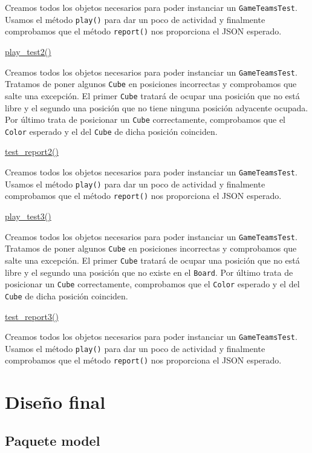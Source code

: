 \documentclass[12pt,a4paper,openright]{book}
\theoremstyle{break}
\begin{document}
Creamos todos los objetos necesarios para poder instanciar un \texttt{GameTeamsTest}. Usamos el método \texttt{play()} para dar un poco de actividad y finalmente comprobamos que el método \texttt{report()} nos proporciona el JSON esperado.

\underline{play\_test2()}

Creamos todos los objetos necesarios para poder instanciar un \texttt{GameTeamsTest}. Tratamos de poner algunos \texttt{Cube} en posiciones incorrectas y comprobamos que salte una excepción. El primer \texttt{Cube} tratará de ocupar una posición que no está libre y el segundo una posición que no tiene ninguna posición adyacente ocupada. Por último trata de posicionar un \texttt{Cube} correctamente, comprobamos que el \texttt{Color} esperado y el del \texttt{Cube} de dicha posición coinciden.

\underline{test\_report2()}

Creamos todos los objetos necesarios para poder instanciar un \texttt{GameTeamsTest}. Usamos el método \texttt{play()} para dar un poco de actividad y finalmente comprobamos que el método \texttt{report()} nos proporciona el JSON esperado.

\underline{play\_test3()}

Creamos todos los objetos necesarios para poder instanciar un \texttt{GameTeamsTest}. Tratamos de poner algunos \texttt{Cube} en posiciones incorrectas y comprobamos que salte una excepción. El primer \texttt{Cube} tratará de ocupar una posición que no está libre y el segundo una posición que no existe en el \texttt{Board}. Por último trata de posicionar un \texttt{Cube} correctamente, comprobamos que el \texttt{Color} esperado y el del \texttt{Cube} de dicha posición coinciden.

\underline{test\_report3()}

Creamos todos los objetos necesarios para poder instanciar un \texttt{GameTeamsTest}. Usamos el método \texttt{play()} para dar un poco de actividad y finalmente comprobamos que el método \texttt{report()} nos proporciona el JSON esperado.

\chapter{Diseño final}

\section{Paquete model}
\end{document}
